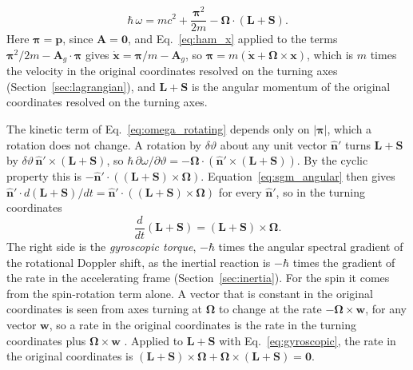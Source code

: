 \documentclass[aps,prd,onecolumn,tightenlines,nofootinbib,notitlepage,11pt,floatfix]{revtex4-2}
\theoremstyle{indentedtheorem}
\begin{document}
\begin{equation}
    \hbar\,\omega = mc^2 + \frac{\boldsymbol{\pi}^2}{2m} - \boldsymbol{\Omega}\cdot(\mathbf{L}+\mathbf{S}) .
    \label{eq:omega_rotating}
\end{equation}
Here $\boldsymbol{\pi}=\mathbf{p}$, since $\mathbf{A}=\mathbf{0}$, and Eq.~\eqref{eq:ham_x} applied to the terms $\boldsymbol{\pi}^2/2m-\mathbf{A}_g\cdot\boldsymbol{\pi}$ gives $\dot{\mathbf{x}}=\boldsymbol{\pi}/m-\mathbf{A}_g$, so $\boldsymbol{\pi}=m(\dot{\mathbf{x}}+\boldsymbol{\Omega}\times\mathbf{x})$, which is $m$ times the velocity in the original coordinates resolved on the turning axes (Section~\ref{sec:lagrangian}), and $\mathbf{L}+\mathbf{S}$ is the angular momentum of the original coordinates resolved on the turning axes.

The kinetic term of Eq.~\eqref{eq:omega_rotating} depends only on $|\boldsymbol{\pi}|$, which a rotation does not change. A rotation by $\delta\vartheta$ about any unit vector $\hat{\mathbf{n}}'$ turns $\mathbf{L}+\mathbf{S}$ by $\delta\vartheta\,\hat{\mathbf{n}}'\times(\mathbf{L}+\mathbf{S})$, so $\hbar\,\partial\omega/\partial\vartheta=-\boldsymbol{\Omega}\cdot(\hat{\mathbf{n}}'\times(\mathbf{L}+\mathbf{S}))$. By the cyclic property this is $-\hat{\mathbf{n}}'\cdot((\mathbf{L}+\mathbf{S})\times\boldsymbol{\Omega})$. Equation~\eqref{eq:sgm_angular} then gives $\hat{\mathbf{n}}'\cdot d(\mathbf{L}+\mathbf{S})/dt=\hat{\mathbf{n}}'\cdot((\mathbf{L}+\mathbf{S})\times\boldsymbol{\Omega})$ for every $\hat{\mathbf{n}}'$, so in the turning coordinates
\begin{equation}
    \frac{d}{dt}(\mathbf{L}+\mathbf{S}) = (\mathbf{L}+\mathbf{S})\times\boldsymbol{\Omega} .
    \label{eq:gyroscopic}
\end{equation}
The right side is the \emph{gyroscopic torque}, $-\hbar$ times the angular spectral gradient of the rotational Doppler shift, as the inertial reaction is $-\hbar$ times the gradient of the rate in the accelerating frame (Section~\ref{sec:inertia}). For the spin it comes from the spin-rotation term alone. A vector that is constant in the original coordinates is seen from axes turning at $\boldsymbol{\Omega}$ to change at the rate $-\boldsymbol{\Omega}\times\mathbf{w}$, for any vector $\mathbf{w}$, so a rate in the original coordinates is the rate in the turning coordinates plus $\boldsymbol{\Omega}\times\mathbf{w}$ \citep{Goldstein2002Classical}. Applied to $\mathbf{L}+\mathbf{S}$ with Eq.~\eqref{eq:gyroscopic}, the rate in the original coordinates is $(\mathbf{L}+\mathbf{S})\times\boldsymbol{\Omega}+\boldsymbol{\Omega}\times(\mathbf{L}+\mathbf{S})=\mathbf{0}$.
\end{document}
